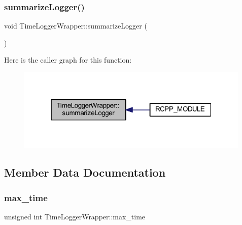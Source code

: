 \subsubsection{\texorpdfstring{summarize\+Logger()}{summarizeLogger()}}
{\footnotesize\ttfamily void Time\+Logger\+Wrapper\+::summarize\+Logger (\begin{DoxyParamCaption}{ }\end{DoxyParamCaption})\hspace{0.3cm}{\ttfamily [inline]}}

Here is the caller graph for this function\+:\nopagebreak
\begin{figure}[H]
\begin{center}
\leavevmode
\includegraphics[width=316pt]{class_time_logger_wrapper_a85e2772d6dbb9de70b3a99eb1f858c83_icgraph}
\end{center}
\end{figure}


\subsection{Member Data Documentation}
\mbox{\label{class_time_logger_wrapper_a94de9106fdc84bc8b061bd9a76ec04d0}} 
\subsubsection{\texorpdfstring{max\+\_\+time}{max\_time}}
{\footnotesize\ttfamily unsigned int Time\+Logger\+Wrapper\+::max\+\_\+time\hspace{0.3cm}{\ttfamily [private]}}

\mbox{\label{class_time_logger_wrapper_a24bb4a8e236cc934bee6f811c0337dc9}} 

